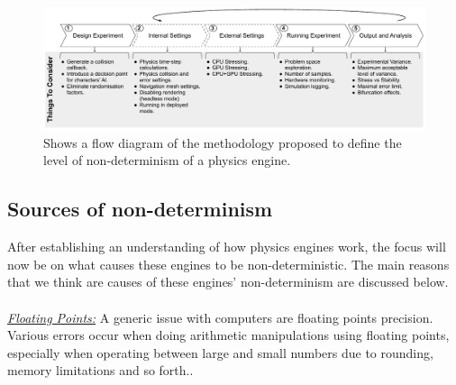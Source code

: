 

\begin{figure}[b]
    \centering
    \includegraphics[width=0.99\linewidth]{Other/Figures/MethodologyDiagramCropped.pdf}
    \caption{Shows a flow diagram of the methodology proposed to define the level of non-determinism of a physics engine.}

    \label{method_diagram}
\end{figure}

\subsection{Sources of non-determinism} \label{s:nondeterminisimSources}
\noindent After establishing an understanding of how physics engines work, the focus will now be on what causes these engines to be non-deterministic. 
The main reasons that we think are causes of these engines' non-determinism are discussed below. \\\\
%
\noindent\underline{\textit{Floating Points:}}
A generic issue with computers are floating points precision. 
Various errors occur when doing arithmetic manipulations using floating points, especially when operating between large and small numbers due to rounding, memory limitations and so forth.\cite{FloatingPointArithmeticArticle}\cite{FloatingPointsBook}.

